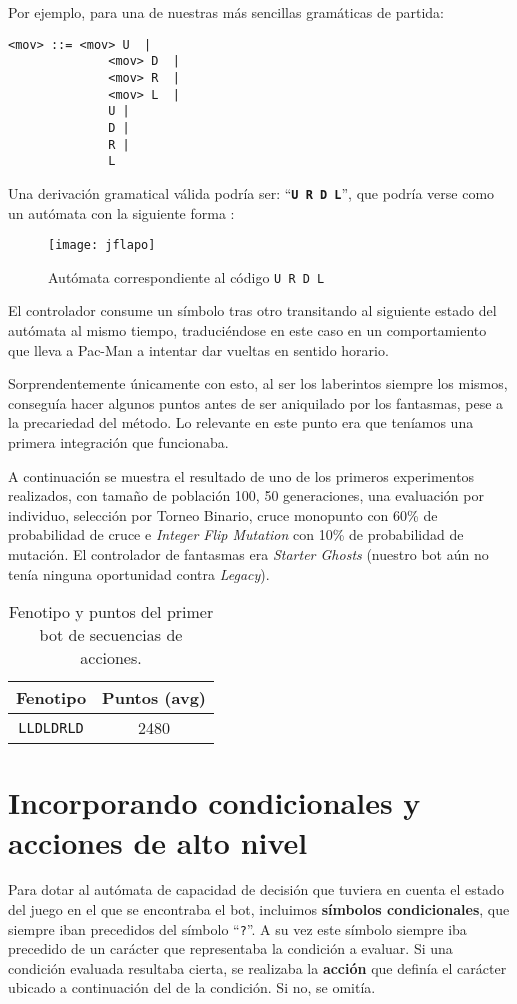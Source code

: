 Por ejemplo, para una de nuestras más sencillas gramáticas de partida:
\begin{lstlisting}[caption=Gramática básica para encadenar movimientos.]
    <mov> ::= <mov> U  | 
              <mov> D  | 
              <mov> R  | 
              <mov> L  |
              U | 
              D | 
              R |
              L
\end{lstlisting}

Una derivación gramatical válida podría ser: ``\textbf{\texttt{U R D L}}'', que podría verse como un autómata con la siguiente forma \cite{jflapPage}:
\begin{figure}[H]
\centering
\texttt{[image: jflapo]}
\caption{Autómata correspondiente al código \texttt{U R D L}}
\end{figure}

El controlador consume un símbolo tras otro transitando al siguiente estado del autómata al mismo tiempo, traduciéndose en este caso en un comportamiento que lleva a Pac-Man a intentar dar vueltas en sentido horario.
 
Sorprendentemente únicamente con esto, al ser los laberintos siempre los mismos, conseguía hacer algunos puntos antes de ser aniquilado por los fantasmas, pese a la precariedad del método. Lo relevante en este punto era que teníamos una primera integración que funcionaba.
 
A continuación se muestra el resultado de uno de los primeros experimentos realizados, con tamaño de población 100, 50 generaciones, una evaluación por individuo, selección por Torneo Binario, cruce monopunto con 60\% de probabilidad de cruce e \textit{Integer Flip Mutation} con 10\% de probabilidad de mutación. El controlador de fantasmas era \textit{Starter Ghosts} (nuestro bot aún no tenía ninguna oportunidad contra \textit{Legacy}).
\begin{table}[H]
\centering
\begin{tabular}{cc}
\hline
\textbf{Fenotipo} & \textbf{Puntos (avg)} \\ \hline
\texttt{LLDLDRLD}          & 2480                  \\ \hline
\end{tabular}
\caption{Fenotipo y puntos del primer bot de secuencias de acciones.}
\end{table}

\section{Incorporando condicionales y acciones de alto nivel}
Para dotar al autómata de capacidad de decisión que tuviera en cuenta el estado del juego en el que se encontraba el bot, incluimos \textbf{símbolos condicionales}, que siempre iban precedidos del símbolo ``\texttt{?}''. A su vez este símbolo siempre iba precedido de un carácter que representaba la condición a evaluar.
Si una condición evaluada resultaba cierta, se realizaba la \textbf{acción} que definía el carácter ubicado a continuación del de la condición. Si no, se omitía. 

